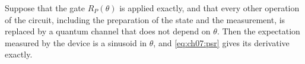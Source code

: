 \documentclass[handoutsbeamer.tex]{subfiles}
\begin{document}
\begin{frame}
\onp{\footnotesize}
\begin{propn}\label{propn:ch07:noise}
Suppose that the gate $R_P(\theta)$ is applied exactly, and that every other operation of the circuit, including the preparation of the state and the measurement, is replaced by a quantum channel that does not depend on $\theta$. Then the expectation measured by the device is a sinusoid in $\theta$, and \eqref{eq:ch07:psr} gives its derivative exactly.
\end{propn}


\end{frame}
\end{document}
